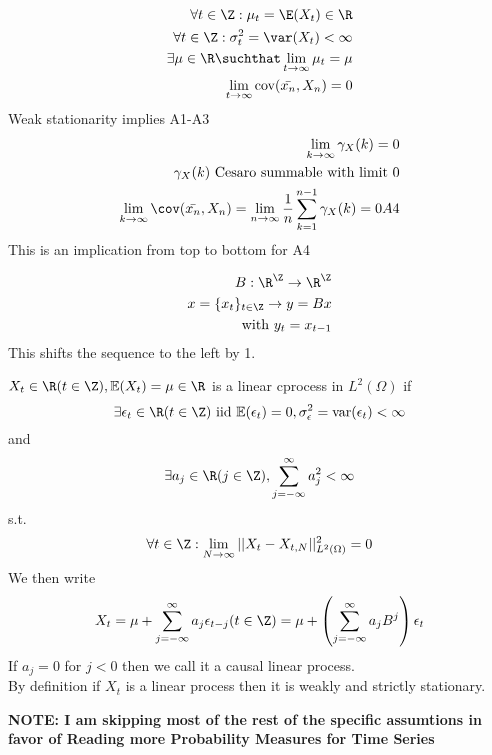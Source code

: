 \documentclass[answers,12pt,addpoints]{exam}
\begin{document}
\begin{definition}[A1-A4]
    \begin{align}
        \forall t \in \Z: \mu_t = \E(X_t) \in \R\\
        \forall t \in \Z: \sigma^2_t = \var(X_t) < \infty\\
        \exists \mu \in \R \suchthat \lim_{t \to \infty} \mu_t = \mu\\
        \lim_{t \to \infty} \text{cov}(\bar{x_n}, X_n)= 0
    \end{align}
    Weak stationarity implies A1-A3\\
    \begin{align*}
        \lim_{k \to \infty} \gamma_X(k) = 0 \\
        \gamma_{X}(k) \text{ Cesaro summable with limit 0}\\
        \lim_{k \to \infty} \cov(\bar{x_n} , X_n) = \lim_{n \to \infty} \frac{1}{n} \sum_{k=1}^{n-1} \gamma_X(k) = 0
        A4
    \end{align*}
    This is an implication from top to bottom for A4
\end{definition}
\begin{definition}
    \begin{align*}
        B: \R^{\Z} \to \R^{\Z}\\
        x = \{x_t\}_{t \in \Z} \to y = Bx \\
        \text{with } y_t = x_{t-1} \\
    \end{align*}
    This shifts the sequence to the left by 1.
\end{definition}
\begin{definition}
    $X_t \in \R (t \in \Z), \mathbb{E} (X_t) = \mu \in \R$ is a linear cprocess in $L^2(\Omega)$ if 
    $$ \exists \epsilon_t \in \R (t \in \Z) \text{ iid } \mathbb{E}(\epsilon_t) = 0, \sigma^2_{\epsilon} = \text{var}(\epsilon_t) < \infty$$
    and 
    $$ \exists a_j \in \R (j \in \Z), \sum_{j=-\infty}^{\infty} a_j^2 < \infty$$
    s.t.
    $$ \forall t \in \Z: \lim_{N \to \infty} || X_t - X_{t,N}||^2_{L^2(\Omega)} = 0$$
    We then write 
    $$ X_t = \mu + \sum_{j=-\infty}^{\infty} a_j \epsilon_{t-j} (t \in \Z) = \mu + \left( \sum_{j = -\infty}^\infty a_j B^j \right) \epsilon_t$$
    If $a_j = 0$ for $j < 0$ then we call it a causal linear process.\\
    By definition if $X_t$ is a linear process then it is weakly and strictly stationary.\\
\end{definition}
\textbf{NOTE: I am skipping most of the rest of the specific assumtions in favor of Reading more Probability Measures for Time Series}
\end{document}
